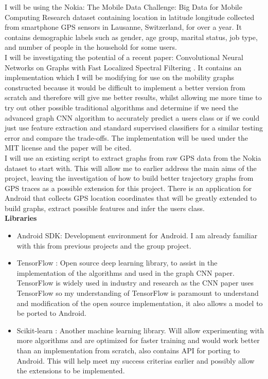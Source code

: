\documentclass[12pt,a4paper,twoside]{article}
\begin{document}
I will be using the Nokia: The Mobile Data Challenge: Big Data for Mobile Computing Research dataset\cite{dataset} containing location in latitude longitude collected from smartphone GPS sensors in Lausanne, Switzerland, for over a year. It contains demographic labels such as gender, age group, marital status, job type, and number of people in the household for some users.\\

I will be investigating the potential of a recent paper: Convolutional Neural Networks on Graphs with Fast Localized Spectral Filtering \cite{CNN1}. It contains an implementation which I will be modifying for use on the mobility graphs constructed because it would be difficult to implement a better version from scratch and therefore will give me better results, whilst allowing me more time to try out other possible traditional algorithms and determine if we need the advanced graph CNN algorithm to accurately predict a users class or if we could just use feature extraction and standard supervised classifiers for a similar testing error and compare the trade-offs. The implementation will be used under the MIT license and the paper will be cited\cite{CNN1}. \\

I will use an existing script to extract graphs from raw GPS data from the Nokia dataset to start with. This will allow me to earlier address the main aims of the project, leaving the investigation of how to build better trajectory graphs from GPS traces as a possible extension for this project. There is an application for Android that collects GPS location coordinates that will be greatly extended to build graphs, extract possible features and  infer the users class.\\
\textbf{Libraries}
\begin{itemize}
\item Android SDK: Development environment for Android. I am already familiar with this from previous projects and the group project.
\item TensorFlow \cite{tensorflow}: Open source deep learning library, to assist in the implementation of the algorithms and used in the graph CNN paper. TensorFlow is widely used in industry and research as the CNN paper uses TensorFlow \cite{CNN1} so my understanding of TensorFlow is paramount to understand and modification of the open source implementation, it also allows a model to be ported to Android. 
\item Scikit-learn \cite{scikitlearn}: Another machine learning library. Will allow experimenting with more algorithms and are optimized for faster training and would work better than an implementation from scratch, also contains API for porting to Android. This will help meet my success criterias earlier and possibly allow the extensions to be implemented.\end{itemize}
\end{document}

